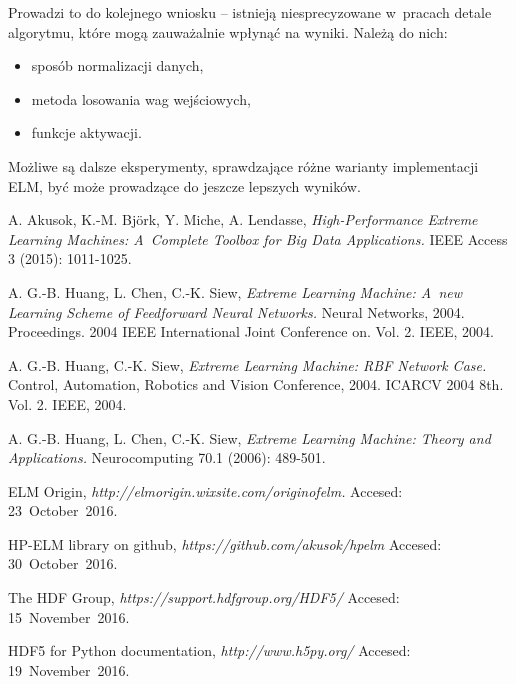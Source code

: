 \documentclass[pl]{minipw} %
\begin{document}
Prowadzi to do kolejnego wniosku -- istnieją niesprecyzowane w~pracach detale algorytmu, które mogą zauważalnie wpłynąć na wyniki.
Należą do nich:
\begin{itemize}
\item sposób normalizacji danych, 
\item metoda losowania wag wejściowych,
\item funkcje aktywacji.
\end{itemize}
Możliwe są dalsze eksperymenty, sprawdzające różne warianty implementacji ELM, być może prowadzące do jeszcze lepszych wyników.
\clearpage





\begin{thebibliography}{20}%

  A. Akusok, K.-M. Björk, Y. Miche, A. Lendasse,
  \emph{High-Performance Extreme Learning Machines: A~Complete Toolbox for Big Data Applications.}
  IEEE Access 3 (2015): 1011-1025.

  A. G.-B. Huang, L. Chen, C.-K. Siew, 
  \emph{Extreme Learning Machine: A~new Learning Scheme of Feedforward Neural Networks.}
   Neural Networks, 2004. Proceedings. 2004 IEEE International Joint Conference on. Vol. 2. IEEE, 2004.

  A. G.-B. Huang, C.-K. Siew, 
  \emph{Extreme Learning Machine: RBF Network Case.} 
  Control, Automation, Robotics and Vision Conference, 2004. ICARCV 2004 8th. Vol. 2. IEEE, 2004.

  A. G.-B. Huang, L. Chen, C.-K. Siew, 
  \emph{Extreme Learning Machine: Theory and Applications.} 
  Neurocomputing 70.1 (2006): 489-501.
  
  ELM Origin,
  \emph{http://elmorigin.wixsite.com/originofelm.}
  Accesed: 23~October~2016.
  
  HP-ELM library on github,
  \emph{https://github.com/akusok/hpelm}
   Accesed: 30~October~2016.

  
  The HDF Group,
  \emph{https://support.hdfgroup.org/HDF5/} 
  Accesed: 15~November~2016.
 
  
  HDF5 for Python documentation,
  \emph{http://www.h5py.org/}
  Accesed: 19~November~2016.


\end{thebibliography}
\end{document}
